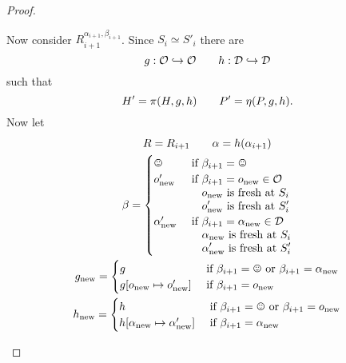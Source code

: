 \begin{proof}
\begin{description}
      Now consider $R_{i+1}^{\alpha_{i+1}, \beta_{i+1}}$. Since $S_i \simeq
      S'_i$ there are
      \begin{equation*}
        g: \mathcal{O} \hookrightarrow \mathcal{O} \quad\quad h: \mathcal{D} \hookrightarrow \mathcal{D}
      \end{equation*}
      such that
      \begin{equation*}
        H' = \pi(H, g, h)  \quad\quad P' = \eta(P, g, h).
      \end{equation*}
      Now let 
      \begin{equation*}
        \begin{gathered}
          R = R_{i+1} \andalso \alpha = h(\alpha_{i+1}) \\
          \beta = 
          \begin{cases}
            \smiley         & \text{ if } \beta_{i+1} = \smiley \\
            o'_{\text{new}} & 
            \begin{aligned}[t]
              \text{ if }&\beta_{i+1} = o_{\text{new}} \in \OIDs \\
              &o_{\text{new}} \text{ is fresh at } S_i \\
              &o'_{\text{new}} \text{ is fresh at } S'_i 
            \end{aligned} \\
            \alpha'_{\text{new}} & \begin{aligned}[t]
              \text{ if }&\beta_{i+1} = \alpha_{\text{new}} \in \TIDs \\
              &\alpha_{\text{new}} \text{ is fresh at } S_i \\
              &\alpha'_{\text{new}} \text{ is fresh at } S'_i
            \end{aligned}
          \end{cases} \\
          g_{\text{new}} = 
          \begin{cases}
            g & \text{ if } \beta_{i+1} = \smiley \text{ or } \beta_{i+1} = 
            \alpha_{\text{new}} \\
            g[o_{\text{new}} \mapsto o'_{\text{new}}] & \text{ if } \beta_{i+1}
            = o_{\text{new}}
          \end{cases} \\
          h_{\text{new}} = 
          \begin{cases}
            h & \text{ if } \beta_{i+1} = \smiley \text{ or } \beta_{i+1} = 
            o_{\text{new}} \\
            h[\alpha_{\text{new}} \mapsto \alpha'_{\text{new}}] & \text{ if } \beta_{i+1}
            = \alpha_{\text{new}}
          \end{cases}
        \end{gathered}
      \end{equation*}


\end{description}
\end{proof}

